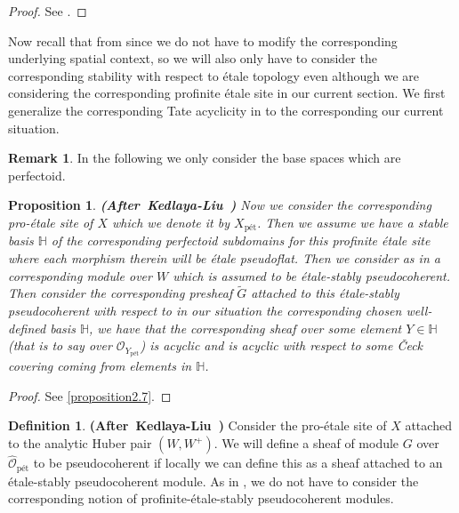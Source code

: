 \documentclass[12pt]{amsart}
\newtheorem{proposition}[theorem]{Proposition}
\theoremstyle{definition}
\newtheorem{definition}[theorem]{Definition}
\newtheorem{remark}[theorem]{Remark}
\numberwithin{equation}{section}
\begin{document}
\begin{proof}
See \cite[Corollary 3.4.5]{KL2}.	
\end{proof}





\indent Now recall that from \cite{KL2} since we do not have to modify the corresponding underlying spatial context, so we will also only have to consider the corresponding stability with respect to \'etale topology even although we are considering the corresponding profinite \'etale site in our current section. We first generalize the corresponding Tate acyclicity in \cite{KL2} to the corresponding our current situation.\\

\begin{remark}
In the following we only consider the base spaces which are perfectoid.	
\end{remark}


\begin{proposition}\mbox{\bf{(After Kedlaya-Liu \cite[Theorem 3.4.6]{KL2})}} 
Now we consider the corresponding pro-\'etale site of $X$ which we denote it by $X_\text{p\'et}$. Then we assume we have a stable basis $\mathbb{H}$ of the corresponding perfectoid subdomains for this profinite \'etale site where each morphism therein will be \'etale pseudoflat. Then we consider as in \cite[Theorem 3.4.6]{KL2} a corresponding module over $W$ which is assumed to be \'etale-stably pseudocoherent. Then consider the corresponding presheaf $\widetilde{G}$ attached to this \'etale-stably pseudocoherent with respect to in our situation the corresponding chosen well-defined basis $\mathbb{H}$, we have that the corresponding sheaf over some element $Y\in \mathbb{H}$ (that is to say over $\mathcal{O}_{Y_\text{p\'et}}$) is acyclic and is acyclic with respect to some \v{C}eck covering coming from elements in $\mathbb{H}$. 
\end{proposition}


\begin{proof}
See \cref{proposition2.7}.
\end{proof}




\begin{definition}\mbox{\bf{(After Kedlaya-Liu \cite[Definition 3.4.7]{KL2})}} 
Consider the pro-\'etale site of $X$ attached to the analytic Huber pair $(W,W^+)$. We will define a sheaf of module $G$ over $\widehat{\mathcal{O}}_\text{p\'et}$ to be pseudocoherent if locally we can define this as a sheaf attached to an \'etale-stably pseudocoherent module. As in \cite[Definition 3.4.7]{KL2}, we do not have to consider the corresponding notion of profinite-\'etale-stably pseudocoherent modules.	
\end{definition}
\end{document}
